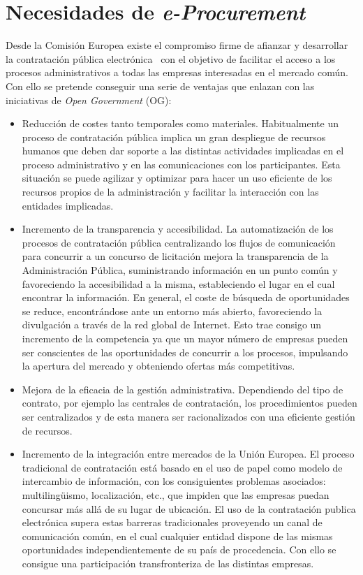 \section{Necesidades de \textit{e-Procurement}}
Desde la Comisión Europea existe el compromiso firme de afianzar y desarrollar la contratación
pública electrónica~\cite{plan2004,e-Proc-green-paper,ePractice} con el objetivo de facilitar el acceso a los procesos administrativos a todas
las empresas interesadas en el mercado común. Con ello se pretende conseguir una serie
de ventajas que enlazan con las iniciativas de \textit{Open Government} (\gls{OG}):
\begin{itemize}
 \item Reducción de costes tanto temporales como materiales. Habitualmente un proceso
de contratación pública implica un gran despliegue de recursos humanos que deben dar 
soporte a las distintas actividades implicadas en el proceso administrativo y en las
comunicaciones con los participantes. Esta situación se puede agilizar y optimizar
para hacer un uso eficiente de los recursos propios de la administración y facilitar
la interacción con las entidades implicadas.
\item Incremento de la transparencia y accesibilidad. La automatización de los procesos
de contratación pública centralizando los flujos de comunicación para concurrir a un concurso
de licitación mejora la transparencia de la Administración Pública, suministrando información
en un punto común y favoreciendo la accesibilidad a la misma, estableciendo el lugar 
en el cual encontrar la información. En general, el coste de búsqueda de oportunidades
se reduce, encontrándose ante un entorno más abierto, favoreciendo la divulgación a través
de la red global de Internet. Esto trae consigo un incremento de la competencia
ya que un mayor número de empresas pueden ser conscientes de las oportunidades de concurrir
a los procesos, impulsando la apertura del mercado y obteniendo ofertas más competitivas.
\item Mejora de la eficacia de la gestión administrativa. Dependiendo del tipo de contrato,
por ejemplo las centrales de contratación, los procedimientos pueden ser centralizados y de esta manera
ser racionalizados con una eficiente gestión de recursos.
\item Incremento de la integración entre mercados de la Unión Europea. El proceso
tradicional de contratación está basado en el uso de papel como modelo de intercambio
de información, con los consiguientes problemas asociados: multiling\"{u}ismo, localización, etc.,  
que impiden que las empresas puedan concursar más allá de su lugar de ubicación. El uso de la contratación
publica electrónica supera estas barreras tradicionales proveyendo un canal de comunicación
común, en el cual cualquier entidad dispone de las mismas oportunidades independientemente
de su país de procedencia. Con ello se consigue una participación transfronteriza
de las distintas empresas.
\end{itemize}

